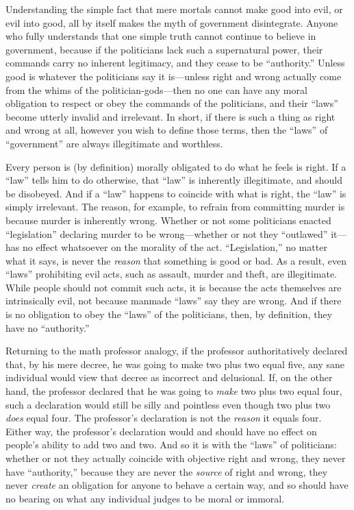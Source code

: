 \documentclass{book}
\begin{document}
Understanding the simple fact that mere mortals cannot make good into evil, or evil into good, all by itself makes the myth of government disintegrate. Anyone who fully understands that one simple truth cannot continue to believe in government, because if the politicians lack such a supernatural power, their commands carry no inherent legitimacy, and they cease to be \enquote{authority.} Unless good is whatever the politicians say it is---unless right and wrong actually come from the whims of the politician-gods---then no one can have any moral obligation to respect or obey the commands of the politicians, and their \enquote{laws} become utterly invalid and irrelevant. In short, if there is such a thing as right and wrong at all, however you wish to define those terms, then the \enquote{laws} of \enquote{government} are always illegitimate and worthless.

Every person is (by definition) morally obligated to do what he feels is right. If a \enquote{law} tells him to do otherwise, that \enquote{law} is inherently illegitimate, and should be disobeyed. And if a \enquote{law} happens to coincide with what is right, the \enquote{law} is simply irrelevant. The reason, for example, to refrain from committing murder is because murder is inherently wrong. Whether or not some politicians enacted \enquote{legislation} declaring murder to be wrong---whether or not they \enquote{outlawed} it---has no effect whatsoever on the morality of the act. \enquote{Legislation,} no matter what it says, is never the \emph{reason} that something is good or bad. As a result, even \enquote{laws} prohibiting evil acts, such as assault, murder and theft, are illegitimate. While people should not commit such acts, it is because the acts themselves are intrinsically evil, not because manmade \enquote{laws} say they are wrong. And if there is no obligation to obey the \enquote{laws} of the politicians, then, by definition, they have no \enquote{authority.}

Returning to the math professor analogy, if the professor authoritatively declared that, by his mere decree, he was going to make two plus two equal five, any sane individual would view that decree as incorrect and delusional. If, on the other hand, the professor declared that he was going to \emph{make} two plus two equal four, such a declaration would still be silly and pointless even though two plus two \emph{does} equal four. The professor's declaration is not the \emph{reason} it equals four. Either way, the professor's declaration would and should have no effect on people's ability to add two and two. And so it is with the \enquote{laws} of politicians: whether or not they actually coincide with objective right and wrong, they never have \enquote{authority,} because they are never the \emph{source} of right and wrong, they never \emph{create} an obligation for anyone to behave a certain way, and so should have no bearing on what any individual judges to be moral or immoral.
\end{document}
